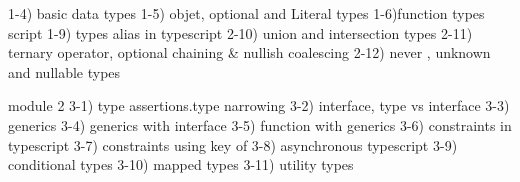 1-4) basic data types
1-5) objet, optional and Literal types
1-6)function types script
1-9) types alias in typescript
2-10) union and intersection types
2-11) ternary operator, optional chaining & nullish coalescing
2-12) never , unknown and nullable types


module 2
3-1) type assertions.type narrowing
3-2) interface, type  vs interface
3-3) generics
3-4) generics with interface
3-5) function with generics
3-6) constraints in typescript
3-7) constraints using key of
3-8) asynchronous typescript
3-9) conditional types
3-10) mapped types
3-11) utility types